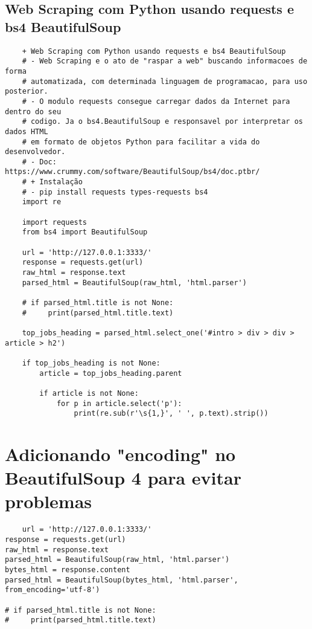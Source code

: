 \documentclass{article}
\begin{document}
\subsection{Web Scraping com Python usando requests e bs4 BeautifulSoup}
\begin{lstlisting}
    + Web Scraping com Python usando requests e bs4 BeautifulSoup
    # - Web Scraping e o ato de "raspar a web" buscando informacoes de forma
    # automatizada, com determinada linguagem de programacao, para uso posterior.
    # - O modulo requests consegue carregar dados da Internet para dentro do seu
    # codigo. Ja o bs4.BeautifulSoup e responsavel por interpretar os dados HTML
    # em formato de objetos Python para facilitar a vida do desenvolvedor.
    # - Doc: https://www.crummy.com/software/BeautifulSoup/bs4/doc.ptbr/
    # + Instalação
    # - pip install requests types-requests bs4
    import re
    
    import requests
    from bs4 import BeautifulSoup
    
    url = 'http://127.0.0.1:3333/'
    response = requests.get(url)
    raw_html = response.text
    parsed_html = BeautifulSoup(raw_html, 'html.parser')
    
    # if parsed_html.title is not None:
    #     print(parsed_html.title.text)
    
    top_jobs_heading = parsed_html.select_one('#intro > div > div > article > h2')
    
    if top_jobs_heading is not None:
        article = top_jobs_heading.parent
    
        if article is not None:
            for p in article.select('p'):
                print(re.sub(r'\s{1,}', ' ', p.text).strip())
\end{lstlisting}
\section{Adicionando "encoding" no BeautifulSoup 4 para evitar problemas }
\begin{lstlisting}
    url = 'http://127.0.0.1:3333/'
response = requests.get(url)
raw_html = response.text
parsed_html = BeautifulSoup(raw_html, 'html.parser')
bytes_html = response.content
parsed_html = BeautifulSoup(bytes_html, 'html.parser', from_encoding='utf-8')

# if parsed_html.title is not None:
#     print(parsed_html.title.text)
\end{lstlisting}
\end{document}
